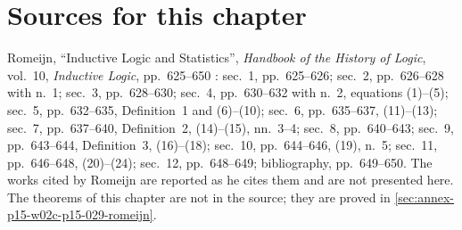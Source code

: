 \section{Sources for this chapter}
\label{sec:p15-w02c-p15-029-rj-sources}

Romeijn, ``Inductive Logic and Statistics'', \emph{Handbook of the
History of Logic}, vol.~10, \emph{Inductive Logic}, pp.~625--650
\cite{Romeijn2011InductiveLogicStatistics}: sec.~1, pp.~625--626;
sec.~2, pp.~626--628 with n.~1; sec.~3, pp.~628--630; sec.~4,
pp.~630--632 with n.~2, equations (1)--(5); sec.~5, pp.~632--635,
Definition~1 and (6)--(10); sec.~6, pp.~635--637, (11)--(13); sec.~7,
pp.~637--640, Definition~2, (14)--(15), nn.~3--4; sec.~8, pp.~640--643;
sec.~9, pp.~643--644, Definition~3, (16)--(18); sec.~10, pp.~644--646,
(19), n.~5; sec.~11, pp.~646--648, (20)--(24); sec.~12, pp.~648--649;
bibliography, pp.~649--650. The works cited by Romeijn are reported as
he cites them and are not presented here. The theorems of this chapter
are not in the source; they are proved in
\cref{sec:annex-p15-w02c-p15-029-romeijn}.

